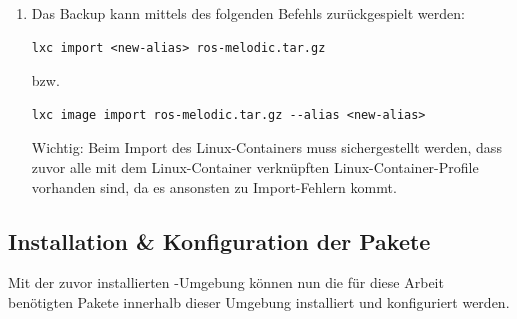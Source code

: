 \begin{enumerate}[label*=\arabic*.]
    \item Das Backup kann mittels des folgenden Befehls zurückgespielt werden:
        \begin{lstlisting}[style=bash]
lxc import <new-alias> ros-melodic.tar.gz
        \end{lstlisting}

        bzw.

        \begin{lstlisting}[style=bash]
lxc image import ros-melodic.tar.gz --alias <new-alias>
        \end{lstlisting}

        \begin{redbox}{Wichtig:}
            Beim Import des Linux-Containers muss sichergestellt werden, dass zuvor alle mit dem Linux-Container verknüpften Linux-Container-Profile vorhanden sind, da es ansonsten zu Import-Fehlern kommt.
        \end{redbox}
\end{enumerate}


\subsection{Installation \& Konfiguration der Pakete}
Mit der zuvor installierten -Umgebung können nun die für diese Arbeit benötigten Pakete innerhalb dieser Umgebung installiert und konfiguriert werden.

